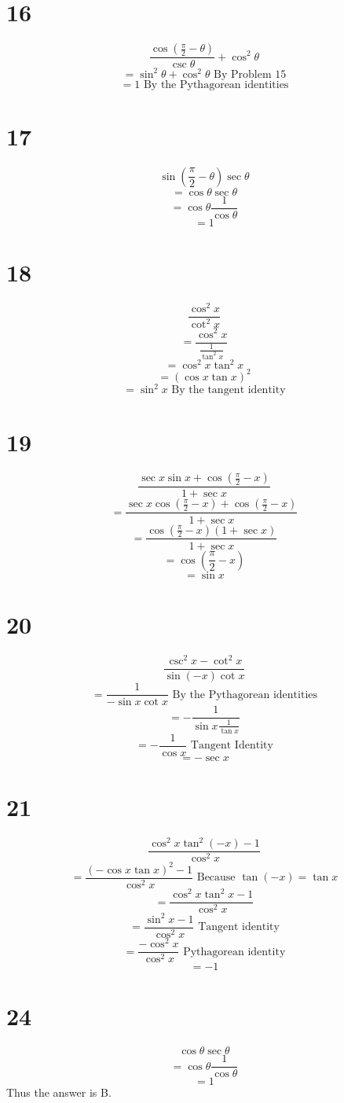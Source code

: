 \documentclass{article}
\theoremstyle{definition}
\newcommand{\?}{\stackrel{?}{=}}
\begin{document}
\section*{16}
\[ \dfrac{\cos\left(\frac{\pi}{2}-\theta\right)}{\csc\theta}+\cos^2\theta \]
\[ =\sin^2\theta+\cos^2\theta\textrm{ By Problem 15} \]
\[ =1\textrm{ By the Pythagorean identities} \]

\section*{17}
\[ \sin\left(\frac{\pi}{2}-\theta\right)\sec\theta \]
\[ =\cos\theta\sec\theta \]
\[ =\cos\theta\frac{1}{\cos\theta} \]
\[ =1 \]

\section*{18}
\[ \frac{\cos^2 x}{\cot^2 x} \]
\[ =\frac{\cos^2 x}{\frac{1}{\tan^2 x}} \]
\[ =\cos^2 x\tan^2 x \]
\[ =\left(\cos x\tan x\right)^2 \]
\[ =\sin^2 x\textrm{ By the tangent identity} \]

\section*{19}
\[ \dfrac{\sec x\sin x+\cos\left(\frac{\pi}{2}-x\right)}{1+\sec x} \]
\[ =\dfrac{\sec x\cos(\frac{\pi}{2}-x)+\cos(\frac{\pi}{2}-x)}{1+\sec x} \]
\[ =\dfrac{\cos(\frac{\pi}{2}-x)(1+\sec x)}{1+\sec x} \]
\[ =\cos(\frac{\pi}{2}-x) \]
\[ =\sin x \]

\section*{20}
\[ \dfrac{\csc^2 x-\cot^2 x}{\sin(-x)\cot x} \]
\[ =\dfrac{1}{-\sin x\cot x}\textrm{ By the Pythagorean identities} \]
\[ =-\dfrac{1}{\sin x\frac{1}{\tan x}} \]
\[ =-\dfrac{1}{\cos x}\textrm{ Tangent Identity} \]
\[ =-\sec x \]

\section*{21}
\[ \dfrac{\cos^2 x\tan^2(-x)-1}{\cos^2 x} \]
\[ =\dfrac{(-\cos x\tan x)^2-1}{\cos^2 x}\textrm{ Because $\tan(-x)=\tan x$} \]
\[ =\dfrac{\cos^2 x\tan^2 x-1}{\cos^2 x} \]
\[ =\dfrac{\sin^2 x-1}{\cos^2 x}\textrm{ Tangent identity} \]
\[ =\dfrac{-\cos^2 x}{\cos^2 x}\textrm{ Pythagorean identity} \]
\[ =-1 \]

\section*{24}
\[ \cos\theta\sec\theta \]
\[ =\cos\theta\frac{1}{\cos\theta} \]
\[ =1 \]
Thus the answer is B.
\end{document}
